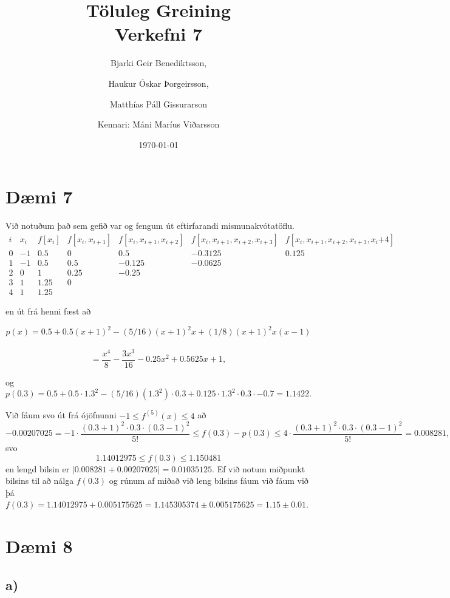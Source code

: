 \documentclass[a4]{article}
\title{Töluleg Greining\\ Verkefni 7}
\date{\today{}}
\author{ 
  Bjarki Geir Benediktsson,\and
  Haukur Óskar Þorgeirsson,\and
  Matthías Páll Gissurarson \and
  Kennari: Máni Maríus Viðarsson
  }
\begin{document}
\maketitle
\section{Dæmi 7}

Við notuðum það sem gefið var og fengum út eftirfarandi
mismunakvótatöflu.
$$
  \begin{array}{|l|l|l|l|l|l|l|}
    \hline
    i & x_i & f[x_i] & f[x_i,x_{i+1}] & f[x_i,x_{i+1},x_{i+2}] & f[x_i,x_{i+1},x_{i+2},x_{i+3}] & f[x_i,x_{i+1},x_{i+2},x_{i+3},x_i{+4}] \\
    \hline
    0 & -1 & 0.5 & 0 & 0.5 & -0.3125 & 0.125 \\
    1 & -1 & 0.5 & 0.5 & -0.125 & -0.0625 & \\
    2 & 0 & 1 & 0.25 & -0.25 & & \\
    3 & 1 & 1.25 & 0 & & & \\
    4 & 1 & 1.25 & & & &
  \end{array}
$$

en út frá henni fæst að

$$p(x) = 0.5 + 0.5(x+1)^2 - (5/16)(x+1)^2x + (1/8)(x+1)^2x(x-1)$$\\
$$= \frac{x^4}{8}-\frac{3x^3}{16}-0.25 x^2+ 0.5625 x+1,$$

og $$p(0.3) = 0.5 + 0.5\cdot 1.3^2 - (5/16)(1.3^2)\cdot 0.3 + 0.125
\cdot 1.3^2\cdot 0.3 \cdot -0.7 = 1.1422.$$

Við fáum svo út frá ójöfnunni $-1 \leq f^{(5)}(x) \leq 4$ að
$$-0.00207025 = -1 \cdot \frac{(0.3+1)^2\cdot 0.3 \cdot (0.3-1)^2}{5!}
\leq f(0.3) - p(0.3) \leq 4 \cdot \frac{(0.3+1)^2\cdot 0.3 \cdot
  (0.3-1)^2}{5!} = 0.008281,$$ svo
$$1.14012975 \leq f(0.3) \leq 1.150481$$ en lengd bilsin er $|0.008281 + 0.00207025| = 0.01035125$.  Ef við notum miðpunkt bilsins til að nálga
$f(0.3)$ og rúnum af miðað við leng bilsins fáum við fáum við þá
$f(0.3) = 1.14012975 + 0.005175625 = 1.145305374 \pm 0.005175625 = 1.15 \pm 0.01$.

\section{Dæmi 8}

\subsection{a)}
\end{document}

